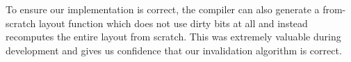 To ensure our implementation is correct,
  the compiler can also generate a from-scratch layout function
  which does not use dirty bits at all
  and instead recomputes the entire layout from scratch.
This was extremely valuable during development
  and gives us confidence that our invalidation algorithm is correct.

